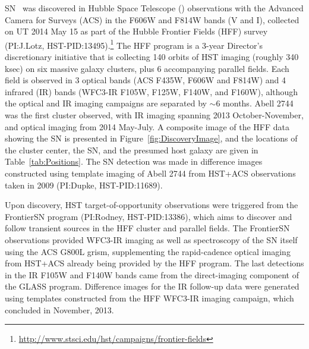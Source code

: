 SN \tomas\ was discovered in Hubble Space Telescope (\HST) observations
with the Advanced Camera for Surveys (ACS) in the F606W and F814W
bands (V and I), collected on UT 2014 May 15 as part of the Hubble
Frontier Fields (HFF) survey (PI:J.Lotz,
HST-PID:13495).\footnote{\url{http://www.stsci.edu/hst/campaigns/frontier-fields}}
The HFF program is a 3-year Director's discretionary initiative that
is collecting 140 orbits of HST imaging (roughly 340 ksec) on six
massive galaxy clusters, plus 6 accompanying parallel fields.  Each
field is observed in 3 optical bands (ACS F435W, F606W and F814W) and
4 infrared (IR) bands (WFC3-IR F105W, F125W, F140W, and F160W),
although the optical and IR imaging campaigns are separated by $\sim$6
months. Abell 2744 was the first cluster observed, with IR imaging
spanning 2013 October-November, and optical imaging from 2014
May-July.  A composite image of the HFF data showing the SN is
presented in Figure~\ref{fig:DiscoveryImage}, and the
locations of the cluster center, the SN, and the presumed host galaxy
are given in Table~\ref{tab:Positions}.  The SN detection was made in
difference images constructed using template imaging of Abell 2744
from HST+ACS observations taken in 2009 (PI:Dupke, HST-PID:11689).






Upon discovery, HST target-of-opportunity observations were triggered
from the FrontierSN program (PI:Rodney, HST-PID:13386), which aims to
discover and follow transient sources in the HFF cluster and parallel
fields. The FrontierSN observations provided WFC3-IR imaging as well
as spectroscopy of the SN itself using the ACS G800L grism,
supplementing the rapid-cadence optical imaging from HST+ACS already
being provided by the HFF program. The last detections in the IR F105W
and F140W bands came from the direct-imaging component of the GLASS
program.  Difference images for the IR follow-up data were generated
using templates constructed from the HFF WFC3-IR imaging campaign,
which concluded in November, 2013.

